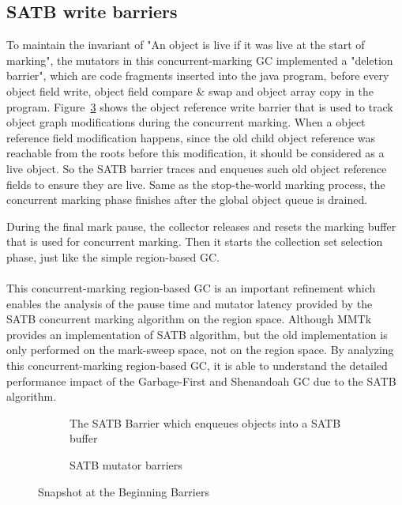 \subsection{SATB write barriers}

To maintain the invariant of "An object is live if it was live at the start of marking",
the mutators in this concurrent-marking GC implemented a "deletion barrier", which are code
fragments inserted into the java program, before every object field write, object field compare \& swap
and object array copy in the program. Figure~\ref{fig:satbbarrier} shows the object reference write barrier that is used
to track object graph modifications during the concurrent marking.
When a object reference field modification happens, since the old child object reference
was reachable from the roots before this modification, it should be considered as a live object.
So the SATB barrier traces and enqueues such old object reference fields to ensure they are live.
Same as the stop-the-world marking process, the concurrent marking phase finishes after
the global object queue is drained.

During the final mark pause, the collector releases and resets the marking buffer that
is used for concurrent marking. Then it starts the collection set selection phase, just like the
simple region-based GC.
\\\\

This concurrent-marking region-based GC is an important refinement which enables
the analysis of the pause time and mutator latency provided by the SATB concurrent marking algorithm on the region space.
Although MMTk provides an implementation of SATB algorithm, but the old implementation
is only performed on the mark-sweep space, not on the region space.
By analyzing this concurrent-marking region-based GC, it is able to understand the
detailed performance impact of the Garbage-First and Shenandoah GC due to the SATB algorithm.

\begin{figure}
  \centering
  \begin{subfigure}[a]{\textwidth}
    
    \caption{The SATB Barrier which enqueues objects into a SATB buffer}
    \label{fig:c:hello}
  \end{subfigure}

  \begin{subfigure}[b]{\textwidth}
    
    \caption{SATB mutator barriers}
    \label{fig:c:hello}
  \end{subfigure}

  \caption{Snapshot at the Beginning Barriers}
  \label{fig:satbbarrier}
\end{figure}

